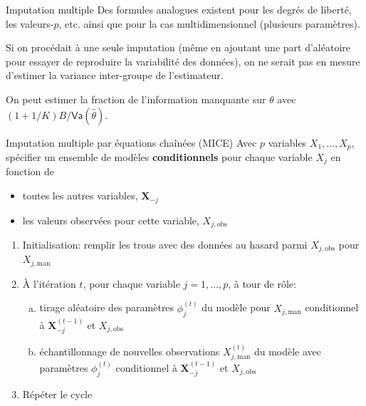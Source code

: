 \documentclass[
  ignorenonframetext,
]{beamer}
\providecommand{\tightlist}{%
  \setlength{\itemsep}{0pt}\setlength{\parskip}{0pt}}\usepackage{longtable,booktabs,array}
\begin{document}
\begin{frame}{Imputation multiple}
\protect\hypertarget{imputation-multiple-1}{}
Des formules analogues existent pour les degrés de liberté, les
valeurs-\(p\), etc. ainsi que pour la cas multidimensionnel (plusieurs
paramètres).

Si on procédait à une seule imputation (même en ajoutant une part
d'aléatoire pour essayer de reproduire la variabilité des données), on
ne serait pas en mesure d'estimer la variance inter-groupe de
l'estimateur.

On peut estimer la fraction de l'information manquante sur \(\theta\)
avec \((1+1/K)B/\mathsf{Va}(\hat{\theta})\).
\end{frame}

\begin{frame}{Imputation multiple par équations chaînées (MICE)}
\protect\hypertarget{imputation-multiple-par-uxe9quations-chauxeenuxe9es-mice}{}
Avec \(p\) variables \(X_1, \ldots, X_p\), spécifier un ensemble de
modèles \textbf{conditionnels} pour chaque variable \(X_j\) en fonction
de

\begin{itemize}
\tightlist
\item
  toutes les autres variables, \(\boldsymbol{X}_{-j}\)
\item
  les valeurs observées pour cette variable, \(X_{j, \text{obs}}\)
\end{itemize}

\begin{enumerate}
\tightlist
\item
  Initialisation: remplir les trous avec des données au hasard parmi
  \(X_{j, \text{obs}}\) pour \(X_{j, \text{man}}\)
\item
  À l'itération \(t\), pour chaque variable \(j=1, \ldots, p\), à tour
  de rôle:

  \begin{enumerate}
  [a)]
  \tightlist
  \item
    tirage aléatoire des paramètres \(\phi_j^{(t)}\) du modèle pour
    \(X_{j,\text{man}}\) conditionnel à \(\boldsymbol{X}_{-j}^{(t-1)}\)
    et \(X_{j, \text{obs}}\)
  \item
    échantillonnage de nouvelles observations \(X^{(t)}_{j,\text{man}}\)
    du modèle avec paramètres \(\phi_j^{(t)}\) conditionnel à
    \(\boldsymbol{X}_{-j}^{(t-1)}\) et \(X_{j, \text{obs}}\)
  \end{enumerate}
\item
  Répéter le cycle
\end{enumerate}
\end{frame}
\end{document}

